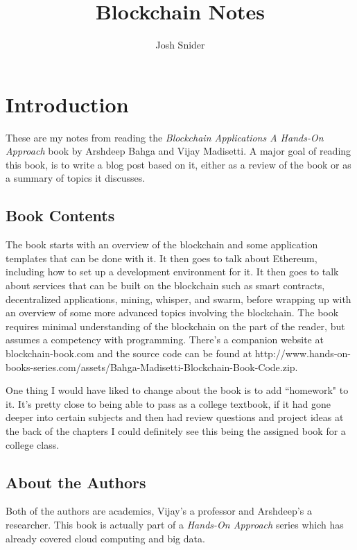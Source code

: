 \documentclass{article}
\begin{document}
\title{Blockchain Notes}
\author{Josh Snider}

\maketitle


\section{Introduction}
These are my notes from reading the \textit{Blockchain Applications A Hands-On Approach} book by Arshdeep Bahga and Vijay Madisetti. A major goal of reading this book, is to write a blog post based on it, either as a review of the book or as a summary of topics it discusses.

\subsection{Book Contents}
The book starts with an overview of the blockchain and some application templates that can be done with it. It then goes to talk about Ethereum, including how to set up a development environment for it. It then goes to talk about services that can be built on the blockchain such as smart contracts, decentralized applications, mining, whisper, and swarm, before wrapping up with an overview of some more advanced topics involving the blockchain. The book requires minimal understanding of the blockchain on the part of the reader, but assumes a competency with programming. There's a companion website at blockchain-book.com and the source code can be found at http://www.hands-on-books-series.com/assets/Bahga-Madisetti-Blockchain-Book-Code.zip.

One thing I would have liked to change about the book is to add ``homework" to it. It's
pretty close to being able to pass as a college textbook, if it had gone deeper into certain subjects and then had review questions and
project ideas at the back of the chapters I could definitely see this being the assigned book for a college class.

\subsection{About the Authors}

Both of the authors are academics, Vijay's a professor and Arshdeep's a researcher. This book is actually part of a \textit{Hands-On Approach} series which has already covered cloud computing and big data.
\end{document}
